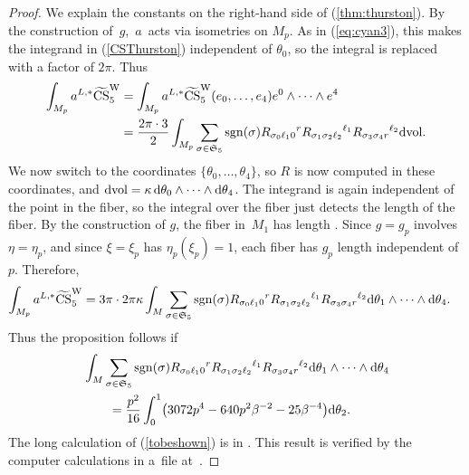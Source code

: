 \documentclass[pdftex]{sigma}
\numberwithin{equation}{section}
\theoremstyle{definition}
\newcommand{\dvol}{{\rm dvol}}
\newcommand{\be}{\eta}
\newcommand{\bxi}{\xi}
\newcommand{\br}{ R}
\newcommand{\bg}{ g}
\newcommand{\sgn}{{\rm sgn}}
\newcommand{\omp}{M_p}
\newcommand{\barcurvature}[2]{R_{#1}{}^{#2}}
\begin{document}
\begin{proof} We explain the constants on the right-hand side of (\ref{thm:thurston}). By the construction of~$\bg$,~$a$~acts via isometries on $\omp$. As in (\ref{eq:cyan3}), this makes the integrand in (\ref{CSThurston}) independent of $\theta_0$, so the integral
is replaced with a factor of $2\pi$. Thus
\begin{align*} \int_{\omp} a^{L,*}\widetilde{{\rm CS}}^{\rm W}_5 &=
 \int_{\omp} a^{L,*}\widetilde{{\rm CS}}^{\rm W}_5(e_0,\dots,e_4) e^0\wedge\cdots\wedge e^4\\
 &=\frac{2\pi\cdot 3}{2} \int_{\omp}
 \sum_{\sigma \in {\mathfrak S_5}}
\sgn(\sigma) \barcurvature{\sigma_0 \ell_1 0}{r}
\barcurvature{\sigma_1 \sigma_2 \ell_2}{\ell_1}
\barcurvature{\sigma_3\sigma_4 r}{\ell_2}\dvol.
\end{align*}
We now switch to the coordinates $\{\theta_0,\dots,\theta_4\}$, so $\br$ is now computed in these coordinates, and $\dvol = \kappa\, {\rm d}\theta_0\wedge\dots
\wedge {\rm d}\theta_4$.
The integrand is again independent of the point in the fiber, so the integral over the fiber just detects the length of the fiber. By the construction of $\bg$, the fiber in~$M_1$ has length \smash{$2\pi
=\int_0^{2\pi} |\bxi|$}.
Since
$g = g_p$ involves $\be = \be_p$, and since $\bxi = \bxi_p$ has $\be_p(\bxi_p) = 1$,
each fiber has $g_p$ length  independent of $p$. Therefore,
\begin{align*} \int_{\omp} a^{L,*}\widetilde{{\rm CS}}^{\rm W}_5 &=
3\pi\cdot 2\pi\kappa
\int_M \sum_{\sigma \in {\mathfrak S_5}}
\sgn(\sigma) \barcurvature{\sigma_0 \ell_1 0}{r}
\barcurvature{\sigma_1 \sigma_2 \ell_2}{\ell_1}
\barcurvature{\sigma_3\sigma_4 r}{\ell_2}{\rm d}\theta_1\wedge\cdots \wedge {\rm d}\theta_4.
\end{align*}
Thus the proposition
follows if
\begin{align}
&\int_M \sum_{\sigma \in {\mathfrak S_5}}
\sgn(\sigma) \barcurvature{\sigma_0 \ell_1 0}{r}
\barcurvature{\sigma_1 \sigma_2 \ell_2}{\ell_1}
\barcurvature{\sigma_3\sigma_4 r}{\ell_2}{\rm d}\theta_1\wedge\cdots \wedge {\rm d}\theta_4 \nonumber \\
&\qquad= \frac{p^2}{16} \int_0^1\bigl(3072p^4 -640p^2\beta^{-2} -25\beta^{-4}\bigr){\rm d}\theta_2.\label{tobeshown}
\end{align}
The long calculation of (\ref{tobeshown}) is in \cite{Egi3}. This result is verified by the computer calculations in a~file
at~\cite{Egi1}.
\end{proof}
\end{document}
